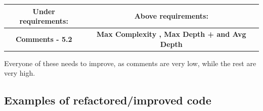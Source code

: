 \documentclass{article}
\begin{document}
\begin{center}
\begin{tabulary}{0.5\textwidth}{| c | c |}
  \hline
Under requirements: & Above requirements: \\ \hline
\textbf{Comments - 5.2} & \textbf{Max Complexity , Max Depth + and Avg Depth } \\ \hline
\end{tabulary}
\end{center}

Everyone of these needs to improve, as comments are very low, while the rest are very high. 

\subsection{Examples of refactored/improved code}
\end{document}
